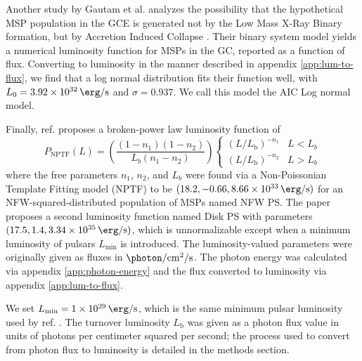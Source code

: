 \documentclass[a4paper,11pt]{article}
\newcommand{\parens}[1]{\left(#1\right)}
\newcommand{\fraci}[2]{#1 / #2}
\newcommand{\comment}[1]{\emph{\color{red}{#1}}}
\begin{document}
Another study by Gautam et al. analyzes the possibility that the hypothetical MSP population in the GCE is generated not by the Low Mass X-Ray Binary formation, but by Accretion Induced Collapse \cite{Gautam:2021wqn}. \comment{To distinguish between this, a definition of these two collapse methods, along with models other than an MSP model, should be put in the introduction. Mention the fact that the MSPs in the GCE would have to look different from that in the disk.} Their binary system model yields a numerical luminosity function for MSPs in the GC, reported as a function of flux. Converting to luminosity in the manner described in appendix \ref{app:lum-to-flux}, we find that a log normal distribution fits their function well, with $L_0 = \SI{3.92e+32}{\erg\per\second}$ and $\sigma = 0.937$. We call this model the AIC Log normal model.

Finally, ref. \cite{Lee:2015fea} proposes a broken-power law luminosity function of
\begin{equation}
    P_\text{NPTF}(L) = \parens{\frac{\parens{1-n_1}\parens{1-n_2}}{L_b \parens{n_1 - n_2}}}\begin{cases}
        \parens{\fraci{L}{L_\text{b}}}^{-n_{1}} & L < L_{b} \\
        \parens{\fraci{L}{L_\text{b}}}^{-n_{2}} & L > L_b
    \end{cases}
    \label{eqn:nptf}
\end{equation}
where the free parameters  $n_1$, $n_2$, and $L_b$ were found via a Non-Poissonian Template Fitting model (NPTF) to be $(18.2, -0.66, \SI{8.66e+33}{\erg\per\second})$ for an NFW-squared-distributed population of MSPs named NFW PS. The paper proposes a second luminosity function named Disk PS with parameters $(17.5, 1.4, \SI{3.34e+35}{\erg\per\second})$, which is unnormalizable except when a minimum luminosity of pulsars $L_\text{min}$ is introduced. \comment{I will want to remove the unnormalizable one. When should I do it?} The luminosity-valued parameters were originally given as fluxes in $\SI{}{\photon \per \centi\meter\squared \per \second}$. The photon energy was calculated via appendix \ref{app:photon-energy} and the flux converted to luminosity via appendix \ref{app:lum-to-flux}.

We set $L_\text{min}=\SI{1e29}{\erg\per\second}$, which is the same minimum pulsar luminosity used by ref. \cite{Zhong:2019ycb}. The turnover luminosity $L_\text{b}$ was given as a photon flux value in units of photons per centimeter squared per second; the process used to convert from photon flux to luminosity is detailed in the methods section.
\end{document}
